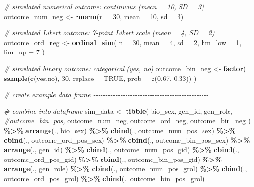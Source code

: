 \documentclass[
]{book}
\newenvironment{Shaded}{\begin{snugshade}}{\end{snugshade}}
\newcommand{\AttributeTok}[1]{\textcolor[rgb]{0.13,0.29,0.53}{#1}}
\newcommand{\CommentTok}[1]{\textcolor[rgb]{0.56,0.35,0.01}{\textit{#1}}}
\newcommand{\ConstantTok}[1]{\textcolor[rgb]{0.56,0.35,0.01}{#1}}
\newcommand{\DecValTok}[1]{\textcolor[rgb]{0.00,0.00,0.81}{#1}}
\newcommand{\FloatTok}[1]{\textcolor[rgb]{0.00,0.00,0.81}{#1}}
\newcommand{\FunctionTok}[1]{\textcolor[rgb]{0.13,0.29,0.53}{\textbf{#1}}}
\newcommand{\NormalTok}[1]{#1}
\newcommand{\OtherTok}[1]{\textcolor[rgb]{0.56,0.35,0.01}{#1}}
\newcommand{\SpecialCharTok}[1]{\textcolor[rgb]{0.81,0.36,0.00}{\textbf{#1}}}
\newcommand{\StringTok}[1]{\textcolor[rgb]{0.31,0.60,0.02}{#1}}
\begin{document}
\begin{Shaded}
\begin{Highlighting}[]
\CommentTok{\# simulated numerical outcome: continuous (mean = 10, SD = 3)}
\NormalTok{outcome\_num\_neg }\OtherTok{\textless{}{-}} \FunctionTok{rnorm}\NormalTok{(}\AttributeTok{n =} \DecValTok{30}\NormalTok{, }\AttributeTok{mean =} \DecValTok{10}\NormalTok{, }\AttributeTok{sd =} \DecValTok{3}\NormalTok{)}

\CommentTok{\# simulated Likert outcome: 7{-}point Likert scale (mean = 4, SD = 2)}
\NormalTok{outcome\_ord\_neg }\OtherTok{\textless{}{-}} \FunctionTok{ordinal\_sim}\NormalTok{(}
  \AttributeTok{n =} \DecValTok{30}\NormalTok{, }\AttributeTok{mean =} \DecValTok{4}\NormalTok{, }\AttributeTok{sd =} \DecValTok{2}\NormalTok{, }\AttributeTok{lim\_low =} \DecValTok{1}\NormalTok{, }\AttributeTok{lim\_up =} \DecValTok{7}
\NormalTok{)}

\CommentTok{\# simulated binary outcome: categorical (yes, no)}
\NormalTok{outcome\_bin\_neg }\OtherTok{\textless{}{-}} \FunctionTok{factor}\NormalTok{(}
  \FunctionTok{sample}\NormalTok{(}\FunctionTok{c}\NormalTok{(}\StringTok{\textquotesingle{}yes\textquotesingle{}}\NormalTok{,}\StringTok{\textquotesingle{}no\textquotesingle{}}\NormalTok{), }\DecValTok{30}\NormalTok{, }\AttributeTok{replace =} \ConstantTok{TRUE}\NormalTok{, }\AttributeTok{prob =} \FunctionTok{c}\NormalTok{(}\FloatTok{0.67}\NormalTok{, }\FloatTok{0.33}\NormalTok{))}
\NormalTok{)}


\CommentTok{\# create example data frame {-}{-}{-}{-}{-}{-}{-}{-}{-}{-}{-}{-}{-}{-}{-}{-}{-}{-}{-}{-}{-}{-}{-}{-}{-}{-}{-}{-}{-}{-}{-}{-}{-}{-}{-}{-}{-}{-}{-}{-}{-}{-}{-}{-}{-}{-}{-}}

\CommentTok{\# combine into dataframe}
\NormalTok{sim\_data }\OtherTok{\textless{}{-}} \FunctionTok{tibble}\NormalTok{(}
\NormalTok{  bio\_sex, gen\_id, gen\_role, }\CommentTok{\#outcome\_bin\_pos, }
\NormalTok{  outcome\_num\_neg, outcome\_ord\_neg, outcome\_bin\_neg}
\NormalTok{  ) }\SpecialCharTok{\%\textgreater{}\%} \FunctionTok{arrange}\NormalTok{(., bio\_sex) }\SpecialCharTok{\%\textgreater{}\%} 
  \FunctionTok{cbind}\NormalTok{(., outcome\_num\_pos\_sex) }\SpecialCharTok{\%\textgreater{}\%}
  \FunctionTok{cbind}\NormalTok{(., outcome\_ord\_pos\_sex) }\SpecialCharTok{\%\textgreater{}\%}
  \FunctionTok{cbind}\NormalTok{(., outcome\_bin\_pos\_sex) }\SpecialCharTok{\%\textgreater{}\%}
  \FunctionTok{arrange}\NormalTok{(., gen\_id) }\SpecialCharTok{\%\textgreater{}\%} 
  \FunctionTok{cbind}\NormalTok{(., outcome\_num\_pos\_gid) }\SpecialCharTok{\%\textgreater{}\%} 
  \FunctionTok{cbind}\NormalTok{(., outcome\_ord\_pos\_gid) }\SpecialCharTok{\%\textgreater{}\%}
  \FunctionTok{cbind}\NormalTok{(., outcome\_bin\_pos\_gid) }\SpecialCharTok{\%\textgreater{}\%}
  \FunctionTok{arrange}\NormalTok{(., gen\_role) }\SpecialCharTok{\%\textgreater{}\%} 
  \FunctionTok{cbind}\NormalTok{(., outcome\_num\_pos\_grol) }\SpecialCharTok{\%\textgreater{}\%} 
  \FunctionTok{cbind}\NormalTok{(., outcome\_ord\_pos\_grol) }\SpecialCharTok{\%\textgreater{}\%}
  \FunctionTok{cbind}\NormalTok{(., outcome\_bin\_pos\_grol)}



\end{Highlighting}
\end{Shaded}
\end{document}
